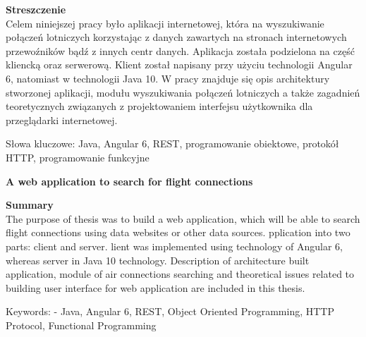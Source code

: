 \documentclass[12pt, twoside]{report}
\newcommand\tab[1][0.5cm]{\hspace*{#1}}
\newcommand\blankpage{%
	\null
    \thispagestyle{empty}%
    \newpage}
\begin{document}
\begin{flushleft}
	{\fontsize{14pt}{12pt}\selectfont
		\textbf{Streszczenie}}\\
	\vspace{1cm}
\tab Celem niniejszej pracy było  aplikacji internetowej, która  na wyszukiwanie połączeń lotniczych korzystając z danych zawartych na stronach internetowych przewoźników bądź z innych centr danych. Aplikacja została podzielona na część kliencką oraz serwerową. Klient został napisany przy użyciu technologii Angular 6, natomiast  w technologii Java 10. W pracy znajduje się opis architektury stworzonej aplikacji, modułu wyszukiwania połączeń lotniczych a także zagadnień teoretycznych związanych z projektowaniem interfejsu użytkownika dla przeglądarki internetowej.
\end{flushleft}
\vspace{0.5cm}
Słowa kluczowe: Java, Angular 6, REST, programowanie obiektowe, protokół HTTP, programowanie funkcyjne

\vspace{1.5cm}

\begin{center}
	{\fontsize{14pt}{12pt}\selectfont
		\textbf{A web application to search for flight connections}}
\end{center}

\begin{flushleft}
	{\fontsize{14pt}{12pt}\selectfont
		\textbf{Summary}}\\
	\vspace{1cm}
\tab The purpose of  thesis was to build a web application, which will be able to search flight connections using data  websites  or other data sources. pplication  into two parts:  client and  server. lient was implemented using technology of Angular 6, whereas server in Java 10 technology. Description of architecture built application, module of air connections searching and theoretical issues related to building user interface for web application are included in this thesis. 
\end{flushleft}
\vspace{0.5cm}
Keywords: - Java, Angular 6, REST, Object Oriented Programming, HTTP Protocol, Functional Programming
\afterpage{\blankpage}


\renewcommand{\contentsname}{Spis treści}
\newpage
{}
\setcounter{page}{9}
\tableofcontents
\end{document}
